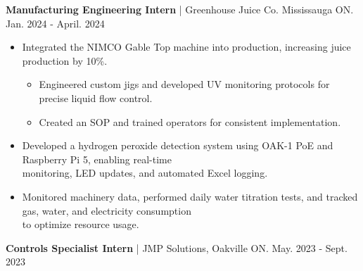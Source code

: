 \documentclass{article}
\begin{document}
\textbf{\hspace{-0.10cm} Manufacturing Engineering Intern} | Greenhouse Juice Co. Mississauga ON. \hspace{2.2cm} {\small Jan. 2024 - April. 2024}

\vspace{-0.2cm}
\begin{itemize}[leftmargin=1.5cm]
    \item Integrated the NIMCO Gable Top machine into production, increasing juice production by 10\%.
    \vspace{-0.2cm}
    \begin{itemize} [label=$\circ$, leftmargin=0.5cm]
        \item Engineered custom jigs and developed UV monitoring protocols for precise liquid flow control.
        \item Created an SOP and trained operators for consistent implementation.
        
    \end{itemize}

    \vspace{-0.1cm}
    \item Developed a hydrogen peroxide detection system using OAK-1 PoE and Raspberry Pi 5, enabling real-time \\ monitoring, LED updates, and automated Excel logging.

    \vspace{-0.1cm}
    \item Monitored machinery data, performed daily water titration tests, and tracked gas, water, and electricity consumption \\ to optimize resource usage.
    
\end{itemize}

\textbf{\hspace{-0.10cm} Controls Specialist Intern} | JMP Solutions, Oakville ON. \hspace{5.3cm} {\small May. 2023 - Sept. 2023}
\end{document}
